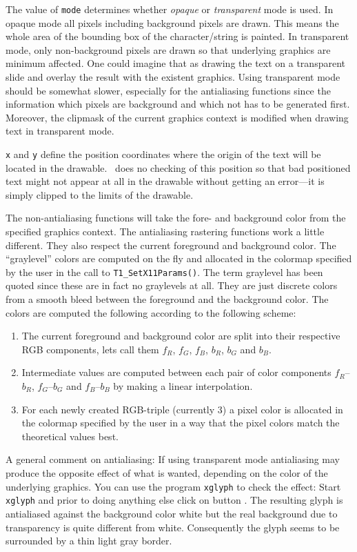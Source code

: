 The value of \verb+mode+ determines whether {\em opaque} or {\em transparent}
mode is used. In opaque mode all pixels including background pixels are
drawn. This means the whole area of the bounding box of the character/string
is painted. In transparent mode, only non-background pixels are drawn so that
underlying graphics are minimum affected. One could imagine that as drawing the
text on a transparent slide and overlay the result with the existent
graphics. Using transparent mode should be somewhat slower, especially for the
antialiasing functions since the information which pixels are background and
which not has to be generated first. Moreover, the clipmask of the current
graphics context is modified when drawing text in transparent mode.

\verb+x+ and \verb+y+ define the position coordinates where the origin of the
text will be located in the drawable. \tonelib\ does no checking of this
position so that bad positioned text might not appear at all in the drawable
without getting an error---it is simply clipped to the limits of the
drawable. 

The non-antialiasing functions will take the fore- and background color from 
the specified graphics context. 
The antialiasing rastering functions work a little different. They also
respect the current foreground and background color. The ``graylevel'' colors
are computed on the fly and allocated in the colormap specified by the user in
the call to \verb+T1_SetX11Params()+. The term graylevel has been quoted since
these are in fact no graylevels at all. They are just discrete colors from a
smooth bleed between the foreground and the background color. The colors are
computed the following according to the following scheme: 
\begin{enumerate}
\item The current foreground and background color are split into their
  respective RGB components, lets call them $f_R$, $f_G$, $f_B$, $b_R$, $b_G$
  and $b_B$.
\item Intermediate values are computed between each pair of color components
  $f_R$--$b_R$, $f_G$--$b_G$ and $f_B$--$b_B$ by making a linear
  interpolation. 
\item For each newly created RGB-triple (currently 3) a pixel color is
  allocated in the colormap specified by the user in a way that the pixel
  colors match the theoretical values best.
\end{enumerate}

A general comment on antialiasing: If using transparent mode antialiasing
may produce the opposite effect of what is wanted, depending on the color of
the underlying graphics. You can use the program \verb+xglyph+ to check the
effect: Start \verb+xglyph+ and prior to doing anything else click on button
. The resulting glyph is antialiased against the background
color white but the real background due to transparency is quite different
from white. Consequently the glyph seems to be surrounded by a thin light gray
border.


